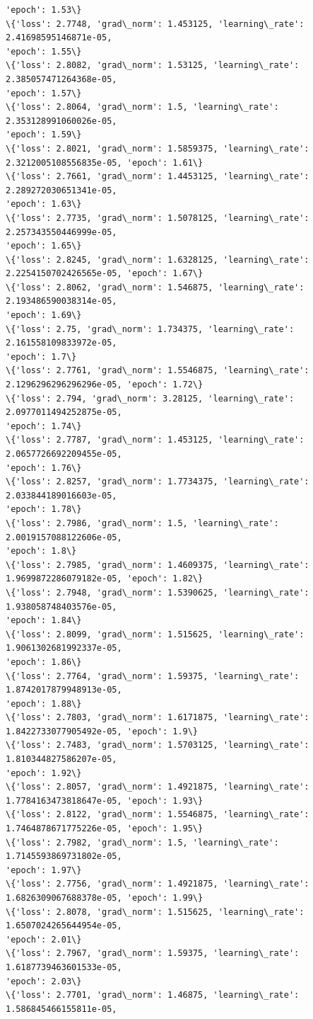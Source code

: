 \documentclass[11pt]{article}
\begin{document}
\begin{Verbatim}[commandchars=\\\{\}]
'epoch': 1.53\}
\{'loss': 2.7748, 'grad\_norm': 1.453125, 'learning\_rate': 2.41698595146871e-05,
'epoch': 1.55\}
\{'loss': 2.8082, 'grad\_norm': 1.53125, 'learning\_rate': 2.385057471264368e-05,
'epoch': 1.57\}
\{'loss': 2.8064, 'grad\_norm': 1.5, 'learning\_rate': 2.353128991060026e-05,
'epoch': 1.59\}
\{'loss': 2.8021, 'grad\_norm': 1.5859375, 'learning\_rate':
2.3212005108556835e-05, 'epoch': 1.61\}
\{'loss': 2.7661, 'grad\_norm': 1.4453125, 'learning\_rate': 2.289272030651341e-05,
'epoch': 1.63\}
\{'loss': 2.7735, 'grad\_norm': 1.5078125, 'learning\_rate': 2.257343550446999e-05,
'epoch': 1.65\}
\{'loss': 2.8245, 'grad\_norm': 1.6328125, 'learning\_rate':
2.2254150702426565e-05, 'epoch': 1.67\}
\{'loss': 2.8062, 'grad\_norm': 1.546875, 'learning\_rate': 2.193486590038314e-05,
'epoch': 1.69\}
\{'loss': 2.75, 'grad\_norm': 1.734375, 'learning\_rate': 2.161558109833972e-05,
'epoch': 1.7\}
\{'loss': 2.7761, 'grad\_norm': 1.5546875, 'learning\_rate':
2.1296296296296296e-05, 'epoch': 1.72\}
\{'loss': 2.794, 'grad\_norm': 3.28125, 'learning\_rate': 2.0977011494252875e-05,
'epoch': 1.74\}
\{'loss': 2.7787, 'grad\_norm': 1.453125, 'learning\_rate': 2.0657726692209455e-05,
'epoch': 1.76\}
\{'loss': 2.8257, 'grad\_norm': 1.7734375, 'learning\_rate': 2.033844189016603e-05,
'epoch': 1.78\}
\{'loss': 2.7986, 'grad\_norm': 1.5, 'learning\_rate': 2.0019157088122606e-05,
'epoch': 1.8\}
\{'loss': 2.7985, 'grad\_norm': 1.4609375, 'learning\_rate':
1.9699872286079182e-05, 'epoch': 1.82\}
\{'loss': 2.7948, 'grad\_norm': 1.5390625, 'learning\_rate': 1.938058748403576e-05,
'epoch': 1.84\}
\{'loss': 2.8099, 'grad\_norm': 1.515625, 'learning\_rate': 1.9061302681992337e-05,
'epoch': 1.86\}
\{'loss': 2.7764, 'grad\_norm': 1.59375, 'learning\_rate': 1.8742017879948913e-05,
'epoch': 1.88\}
\{'loss': 2.7803, 'grad\_norm': 1.6171875, 'learning\_rate':
1.8422733077905492e-05, 'epoch': 1.9\}
\{'loss': 2.7483, 'grad\_norm': 1.5703125, 'learning\_rate': 1.810344827586207e-05,
'epoch': 1.92\}
\{'loss': 2.8057, 'grad\_norm': 1.4921875, 'learning\_rate':
1.7784163473818647e-05, 'epoch': 1.93\}
\{'loss': 2.8122, 'grad\_norm': 1.5546875, 'learning\_rate':
1.7464878671775226e-05, 'epoch': 1.95\}
\{'loss': 2.7982, 'grad\_norm': 1.5, 'learning\_rate': 1.7145593869731802e-05,
'epoch': 1.97\}
\{'loss': 2.7756, 'grad\_norm': 1.4921875, 'learning\_rate':
1.6826309067688378e-05, 'epoch': 1.99\}
\{'loss': 2.8078, 'grad\_norm': 1.515625, 'learning\_rate': 1.6507024265644954e-05,
'epoch': 2.01\}
\{'loss': 2.7967, 'grad\_norm': 1.59375, 'learning\_rate': 1.6187739463601533e-05,
'epoch': 2.03\}
\{'loss': 2.7701, 'grad\_norm': 1.46875, 'learning\_rate': 1.586845466155811e-05,

\end{Verbatim}
\end{document}
